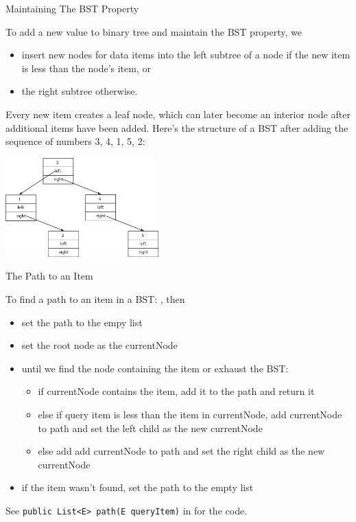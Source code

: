 \documentclass{beamer}
\begin{document}
\begin{frame}[fragile]{Maintaining The BST Property}


To add a new value to binary tree and maintain the BST property, we
\begin{itemize}
\item insert new nodes for data items into the left subtree of a node if the new item is less than the node's item, or
\item the right subtree otherwise.
\end{itemize}
Every new item creates a leaf node, which can later become an interior node after additional items have been added. Here's the structure of a BST after adding the sequence of numbers 3, 4, 1, 5, 2:
\vspace{-.05in}
\begin{center}
\includegraphics[height=1.5in]{binary-tree-nums.png}
\end{center}

\end{frame}

\begin{frame}[fragile]{The Path to an Item}

To find a path to an item in a BST: , then
\begin{itemize}
\item set the path to the empy list
\item set the root node as the currentNode
\item until we find the node containing the item or exhaust the BST:
\begin{itemize}
\item if currentNode contains the item, add it to the path and return it
\item else if query item is less than the item in currentNode, add currentNode to path and set the left child as the new currentNode
\item else add add currentNode to path and set the right child as the new currentNode
\end{itemize}
\item if the item wasn't found, set the path to the empty list
\end{itemize}


See {\tt public List<E> path(E queryItem)} in  for the code.

\end{frame}
\end{document}
